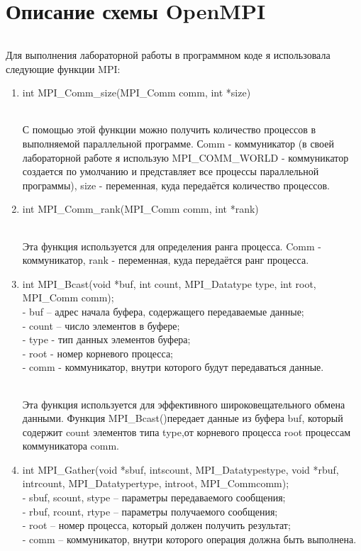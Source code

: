 \documentclass[12pt,a4paper]{article}
\begin{document}
\part*{Описание схемы OpenMPI}
\paragraph{} Для выполнения лабораторной работы в программном коде я использовала следующие функции MPI:
\begin{enumerate} 
\item int MPI\_Comm\_size(MPI\_Comm comm, int *size)
\paragraph{}С помощью этой функции можно получить количество процессов в выполняемой параллельной программе. Сomm - коммуникатор (в своей лабораторной работе я использую  MPI\_COMM\_WORLD - коммуникатор создается по умолчанию и представляет все процессы параллельной программы), size - переменная, куда передаётся количество процессов.
\item int MPI\_Comm\_rank(MPI\_Comm comm, int *rank)
\paragraph{}Эта функция используется для определения ранга процесса. Comm - коммуникатор, rank - переменная, куда передаётся ранг процесса.

\item int MPI\_Bcast(void *buf, int count, MPI\_Datatype type, int root, MPI\_Comm comm);\\
- buf – адрес начала буфера, содержащего передаваемые данные;\\
- count – число элементов в буфере;\\
- type - тип данных элементов буфера;\\
- root - номер корневого процесса;\\
- comm - коммуникатор, внутри которого будут передаваться данные.
\paragraph{} Эта функция используется для эффективного широковещательного обмена данными. Функция MPI\_Bcast()передает данные из буфера buf, который содержит count элементов типа type,от корневого процесса root процессам коммуникатора comm.

\item int MPI\_Gather(void *sbuf, intscount, MPI\_Datatypestype,
void *rbuf, intrcount, MPI\_Datatypertype,
introot, MPI\_Commcomm);\\
- sbuf, scount, stype – параметры передаваемого сообщения;\\
- rbuf, rcount, rtype – параметры получаемого сообщения;\\
- root – номер процесса, который должен получить результат;\\
- comm – коммуникатор, внутри которого операция должна быть выполнена.

\end{enumerate}
\end{document}
